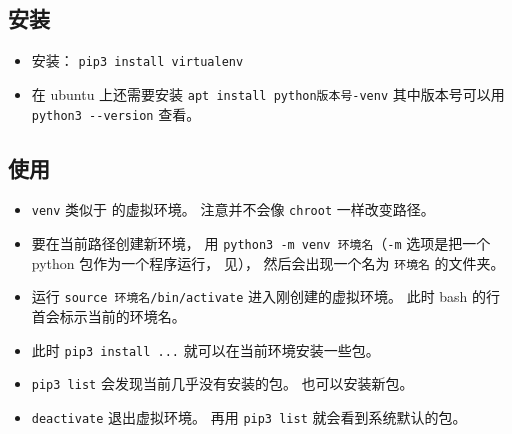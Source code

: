 
\begin{issues}
\issueDraft
\end{issues}


\subsection{安装}
\begin{itemize}
\item 安装： \verb|pip3 install virtualenv|
\item 在 ubuntu 上还需要安装 \verb|apt install python版本号-venv| 其中版本号可以用 \verb|python3 --version| 查看。
\end{itemize}

\subsection{使用}
\begin{itemize}
\item \verb|venv| 类似于  的虚拟环境。 注意并不会像 \verb|chroot| 一样改变路径。
\item 要在当前路径创建新环境， 用 \verb|python3 -m venv 环境名|（\verb|-m| 选项是把一个 python 包作为一个程序运行， 见）， 然后会出现一个名为 \verb|环境名| 的文件夹。
\item 运行 \verb|source 环境名/bin/activate| 进入刚创建的虚拟环境。 此时 bash 的行首会标示当前的环境名。
\item 此时 \verb|pip3 install ...| 就可以在当前环境安装一些包。
\item \verb|pip3 list| 会发现当前几乎没有安装的包。 也可以安装新包。
\item \verb|deactivate| 退出虚拟环境。 再用 \verb|pip3 list| 就会看到系统默认的包。
\end{itemize}
